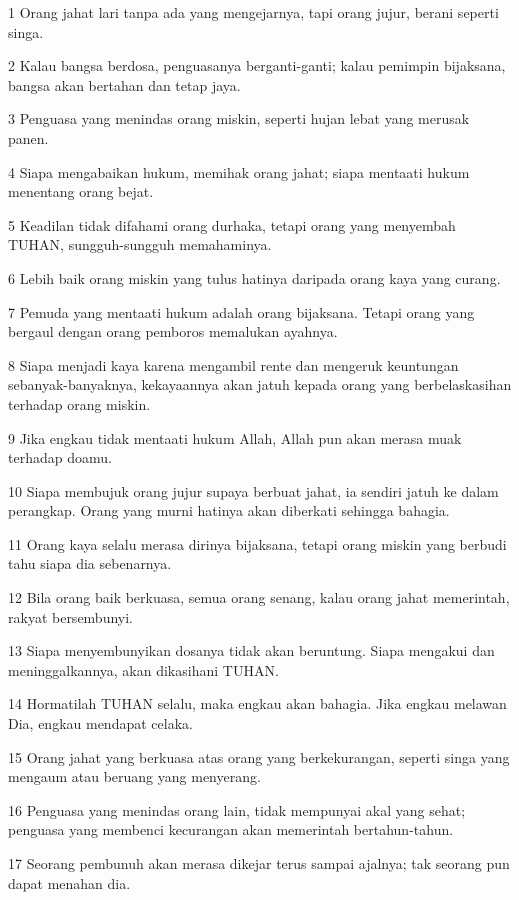 \par 1 Orang jahat lari tanpa ada yang mengejarnya, tapi orang jujur, berani seperti singa.
\par 2 Kalau bangsa berdosa, penguasanya berganti-ganti; kalau pemimpin bijaksana, bangsa akan bertahan dan tetap jaya.
\par 3 Penguasa yang menindas orang miskin, seperti hujan lebat yang merusak panen.
\par 4 Siapa mengabaikan hukum, memihak orang jahat; siapa mentaati hukum menentang orang bejat.
\par 5 Keadilan tidak difahami orang durhaka, tetapi orang yang menyembah TUHAN, sungguh-sungguh memahaminya.
\par 6 Lebih baik orang miskin yang tulus hatinya daripada orang kaya yang curang.
\par 7 Pemuda yang mentaati hukum adalah orang bijaksana. Tetapi orang yang bergaul dengan orang pemboros memalukan ayahnya.
\par 8 Siapa menjadi kaya karena mengambil rente dan mengeruk keuntungan sebanyak-banyaknya, kekayaannya akan jatuh kepada orang yang berbelaskasihan terhadap orang miskin.
\par 9 Jika engkau tidak mentaati hukum Allah, Allah pun akan merasa muak terhadap doamu.
\par 10 Siapa membujuk orang jujur supaya berbuat jahat, ia sendiri jatuh ke dalam perangkap. Orang yang murni hatinya akan diberkati sehingga bahagia.
\par 11 Orang kaya selalu merasa dirinya bijaksana, tetapi orang miskin yang berbudi tahu siapa dia sebenarnya.
\par 12 Bila orang baik berkuasa, semua orang senang, kalau orang jahat memerintah, rakyat bersembunyi.
\par 13 Siapa menyembunyikan dosanya tidak akan beruntung. Siapa mengakui dan meninggalkannya, akan dikasihani TUHAN.
\par 14 Hormatilah TUHAN selalu, maka engkau akan bahagia. Jika engkau melawan Dia, engkau mendapat celaka.
\par 15 Orang jahat yang berkuasa atas orang yang berkekurangan, seperti singa yang mengaum atau beruang yang menyerang.
\par 16 Penguasa yang menindas orang lain, tidak mempunyai akal yang sehat; penguasa yang membenci kecurangan akan memerintah bertahun-tahun.
\par 17 Seorang pembunuh akan merasa dikejar terus sampai ajalnya; tak seorang pun dapat menahan dia.
